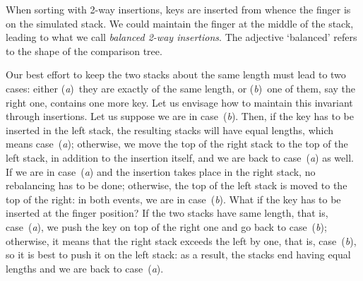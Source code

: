 When sorting with 2-way insertions, keys are inserted from whence the
finger is on the simulated stack. We could maintain the finger at the
middle of the stack, leading to what we call \emph{balanced 2-way
  insertions}. The adjective `balanced' refers to the shape of the
comparison tree.

Our best effort to keep the two stacks about the same length must lead
to two cases: either (\textsl{a})~they are exactly of the same length,
or (\textsl{b})~one of them, say the right one, contains one more
key. Let us envisage how to maintain this invariant through
insertions. Let us suppose we are in case~(\textsl{b}). Then, if the
key has to be inserted in the left stack, the resulting stacks will
have equal lengths, which means case~(\textsl{a}); otherwise, we move
the top of the right stack to the top of the left stack, in addition
to the insertion itself, and we are back to case~(\textsl{a}) as
well. If we are in case~(\textsl{a}) and the insertion takes place in
the right stack, no rebalancing has to be done; otherwise, the top of
the left stack is moved to the top of the right: in both events, we
are in case~(\textsl{b}). What if the key has to be inserted at the
finger position?  If the two stacks have same length, that is,
case~(\textsl{a}), we push the key on top of the right one and go back
to case~(\textsl{b}); otherwise, it means that the right stack exceeds
the left by one, that is, case~(\textsl{b}), so it is best to push it
on the left stack: as a result, the stacks end having equal lengths
and we are back to case~(\textsl{a}).

